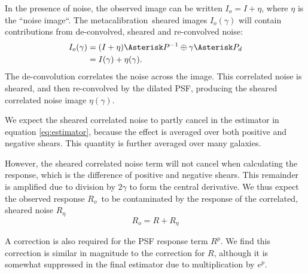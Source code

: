 \documentclass[usegraphicx,usenatbib]{mn2e}
\newcommand{\mcal}{metacalibration}
\newcommand{\mcalR}{$R$}
\newcommand{\mcalRpsf}{$R^{p}$}
\newcommand{\mcalRo}{$R_o$}
\newcommand{\mcalRnoise}{$R_\eta$}
\begin{document}
In the presence of noise, the observed image can be written $I_o=I+\eta$, where $\eta$
is the ``noise image``.  The \mcal\ sheared images $I_o(\gamma)$ will contain
contributions from de-convolved, sheared and re-convolved noise:
\begin{align}
    I_{o}(\gamma) &= (I + \eta) \Asterisk P^{-1} \oplus \gamma \Asterisk P_{d} \nonumber \\
    &= I(\gamma) + \eta(\gamma).
\end{align}
The de-convolution correlates the noise
across the image.  This correlated noise is sheared, and then re-convolved by
the dilated PSF, producing the sheared correlated noise image $\eta(\gamma)$.

We expect the sheared correlated noise to partly cancel in the estimator in
equation \ref{eq:estimator}, because the effect is averaged over both positive
and negative shears. This quantity is further averaged over many galaxies.

However, the sheared correlated noise term will not cancel when calculating the
response, which is the difference of positive and negative shears.  This
remainder is amplified due to division by $2 \gamma$ to form the central
derivative.  We thus expect the observed response \mcalRo\ to be contaminated
by the response of the correlated, sheared noise \mcalRnoise\
\begin{equation}
    \mbox{\mcalRo}  =  R + \mbox{\mcalRnoise}
\end{equation}

A correction is also required for the PSF response term \mcalRpsf.  We find
this correction is similar in magnitude to the correction for \mcalR, although
it is somewhat suppressed in the final estimator due to multiplication by $e^p$.

\end{document}
